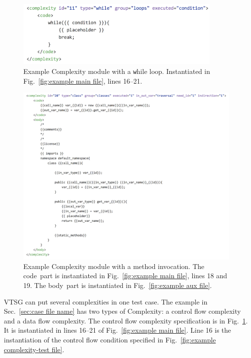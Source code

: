 \documentclass[12pt]{article}
\begin{document}
\begin{figure}[htbp]
  \includegraphics[width=4in]{fig_Complexity_file_while.png}
  \caption{Example Complexity module with a {\texttt while} loop.  Instantiated in 
    Fig.~\ref{fig:example main file}, lines 16--21.}
  \label{fig:example complexity-while file}
\end{figure}

\begin{figure}[htbp]
  \includegraphics[width=\linewidth]{fig_Complexity_file_method.png}
  \caption{Example Complexity module with a method invocation.  
  The \texlangle code\texrangle\  part is instantiated in
  Fig.~\ref{fig:example main file}, lines 18 and 19. 
  The \texlangle body\texrangle\  part is instantiated in
  Fig.~\ref{fig:example aux file}.}
  \label{fig:example complexity-method file}
\end{figure}

VTSG can put several complexities in one test case.
The example in Sec.~\ref{sec:case file name} has two types of
Complexity: a control flow complexity and a data flow complexity. 
The control flow complexity specification is in 
Fig.~\ref{fig:example complexity-while file}.  It is instantiated in 
lines 16--21 of
Fig.~\ref{fig:example main file}.  Line 16 is the instantiation of 
the control flow condition
specified in Fig.~\ref{fig:example complexity-test file}.
\end{document}
